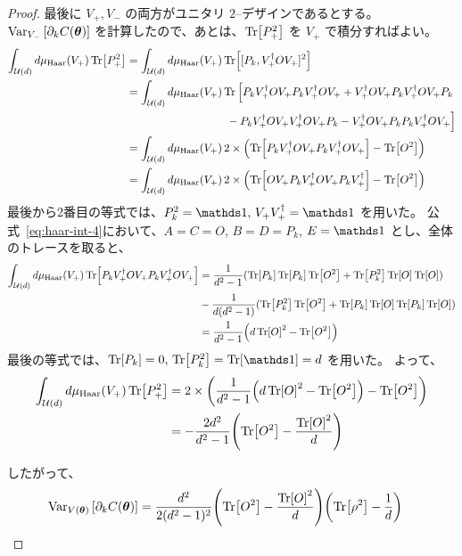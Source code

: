 \begin{proof}
    最後に $V_+, V_-$ の両方がユニタリ $2$--デザインであるとする。$\operatorname{Var}_{V_-}\qty[\partial_k C(\boldsymbol{\theta})]$ を計算したので、あとは、$\Tr[P_+^2]$ を $V_+$ で積分すればよい。
    \begin{align}
        \int_{\mathcal{U}(d)} d\mu_{\mathrm{Haar}}(V_+) \Tr[P_+^2]
        &= \int_{\mathcal{U}(d)} d\mu_{\mathrm{Haar}}(V_+) \Tr[[P_k, V_+^\dagger OV_+]^2]\\
        &= \int_{\mathcal{U}(d)} d\mu_{\mathrm{Haar}}(V_+)
        \Tr\Big[P_k V_+^\dagger OV_+ P_k V_+^\dagger OV_+ + V_+^\dagger OV_+ P_k V_+^\dagger OV_+ P_k\nonumber\\
        &\qquad\qquad\qquad\qquad\quad - P_k V_+^\dagger OV_+ V_+^\dagger OV_+ P_k -  V_+^\dagger OV_+ P_k P_k V_+^\dagger OV_+\Big]\\
        &= \int_{\mathcal{U}(d)} d\mu_{\mathrm{Haar}}(V_+)\,
        2\times\qty(\Tr[P_k V_+^\dagger OV_+ P_k V_+^\dagger OV_+]- \Tr[O^2])\\
        &= \int_{\mathcal{U}(d)} d\mu_{\mathrm{Haar}}(V_+)\,
        2\times\qty(\Tr[OV_+ P_k V_+^\dagger OV_+P_kV_+^\dagger]- \Tr[O^2])
    \end{align}
    最後から2番目の等式では、$P_k^2 = \bbid,\,V_+V_+\dg = \bbid$ を用いた。
    公式~\eqref{eq:haar-int-4}において、$A = C = O$, $B = D = P_k$, $E = \bbid$ とし、全体のトレースを取ると、
    \begin{align}
        \int_{\mathcal{U}(d)} d\mu_{\mathrm{Haar}}(V_+) \Tr[P_k V_+^\dagger OV_+ P_k V_+^\dagger OV_+]
        &= \frac{1}{d^2-1}(\Tr[P_k]\Tr[P_k]\Tr[O^2] + \Tr[P_k^2]\Tr[O]\Tr[O]) \nonumber\\
        &- \frac{1}{d(d^2-1)}(\Tr[P_k^2]\Tr[O^2] + \Tr[P_k]\Tr[O]\Tr[P_k]\Tr[O])\\
        &= \frac{1}{d^2-1}\qty(d\Tr[O]^2 - \Tr[O^2])
    \end{align}
    最後の等式では、$\Tr[P_k] = 0,\,\Tr[P_k^2] = \Tr[\bbid] = d$ を用いた。
    よって、
    \begin{align}
        \int_{\mathcal{U}(d)} d\mu_{\mathrm{Haar}}(V_+) \Tr[P_+^2]
        &= 2\times \qty(\frac{1}{d^2-1}\qty(d\Tr[O]^2 - \Tr[O^2]) - \Tr[O^2])\\
        &= - \frac{2d^2}{d^2-1}\qty(\Tr[O^2] - \frac{\Tr[O]^2}{d})
    \end{align}
    
    したがって、
    \begin{align}
        \operatorname{Var}_{V(\boldsymbol{\theta})}\qty[\partial_k C(\boldsymbol{\theta})]
        &= \frac{d^2}{2(d^2-1)^2}\qty(\Tr[O^2] - \frac{\Tr[O]^2}{d})\qty(\Tr[\rho^2] - \frac{1}{d})
    \end{align}
\end{proof}
